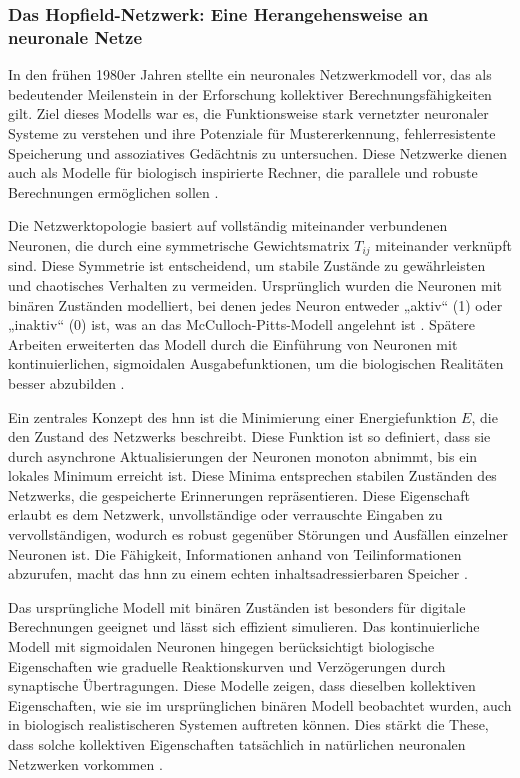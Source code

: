 \subsubsection{Das Hopfield-Netzwerk: Eine Herangehensweise an neuronale Netze}
\label{chap:Das Hopfield-Netzwerk: Eine Herangehensweise an neuronale Netze}

In den frühen 1980er Jahren stellte \citeauthor{Hopfield1982} ein neuronales Netzwerkmodell vor, das als bedeutender Meilenstein in der Erforschung kollektiver Berechnungsfähigkeiten gilt. Ziel dieses Modells war es, die Funktionsweise stark vernetzter neuronaler Systeme zu verstehen und ihre Potenziale für Mustererkennung, fehlerresistente Speicherung und assoziatives Gedächtnis zu untersuchen. Diese Netzwerke dienen auch als Modelle für biologisch inspirierte Rechner, die parallele und robuste Berechnungen ermöglichen sollen \cite[vgl. S. 2554]{Hopfield1982} \cite[vgl. S. 3088]{Hopfield1984}.

Die Netzwerktopologie basiert auf vollständig miteinander verbundenen Neuronen, die durch eine symmetrische Gewichtsmatrix \(T_{ij}\) miteinander verknüpft sind. Diese Symmetrie ist entscheidend, um stabile Zustände zu gewährleisten und chaotisches Verhalten zu vermeiden. Ursprünglich wurden die Neuronen mit binären Zuständen modelliert, bei denen jedes Neuron entweder „aktiv“ (1) oder „inaktiv“ (0) ist, was an das McCulloch-Pitts-Modell angelehnt ist \cite[vgl. S. 2555]{Hopfield1982}. Spätere Arbeiten erweiterten das Modell durch die Einführung von Neuronen mit kontinuierlichen, sigmoidalen Ausgabefunktionen, um die biologischen Realitäten besser abzubilden \cite[vgl. S. 3088]{Hopfield1984}.

Ein zentrales Konzept des \ac{hnn} ist die Minimierung einer Energiefunktion \(E\), die den Zustand des Netzwerks beschreibt. Diese Funktion ist so definiert, dass sie durch asynchrone Aktualisierungen der Neuronen monoton abnimmt, bis ein lokales Minimum erreicht ist. Diese Minima entsprechen stabilen Zuständen des Netzwerks, die gespeicherte Erinnerungen repräsentieren. Diese Eigenschaft erlaubt es dem Netzwerk, unvollständige oder verrauschte Eingaben zu vervollständigen, wodurch es robust gegenüber Störungen und Ausfällen einzelner Neuronen ist. Die Fähigkeit, Informationen anhand von Teilinformationen abzurufen, macht das \ac{hnn} zu einem echten inhaltsadressierbaren Speicher \cite[vgl. S. 2554 f.]{Hopfield1982}.

Das ursprüngliche Modell mit binären Zuständen ist besonders für digitale Berechnungen geeignet und lässt sich effizient simulieren. Das kontinuierliche Modell mit sigmoidalen Neuronen hingegen berücksichtigt biologische Eigenschaften wie graduelle Reaktionskurven und Verzögerungen durch synaptische Übertragungen. Diese Modelle zeigen, dass dieselben kollektiven Eigenschaften, wie sie im ursprünglichen binären Modell beobachtet wurden, auch in biologisch realistischeren Systemen auftreten können. Dies stärkt die These, dass solche kollektiven Eigenschaften tatsächlich in natürlichen neuronalen Netzwerken vorkommen \cite[vgl. S. 3089]{Hopfield1984}.

